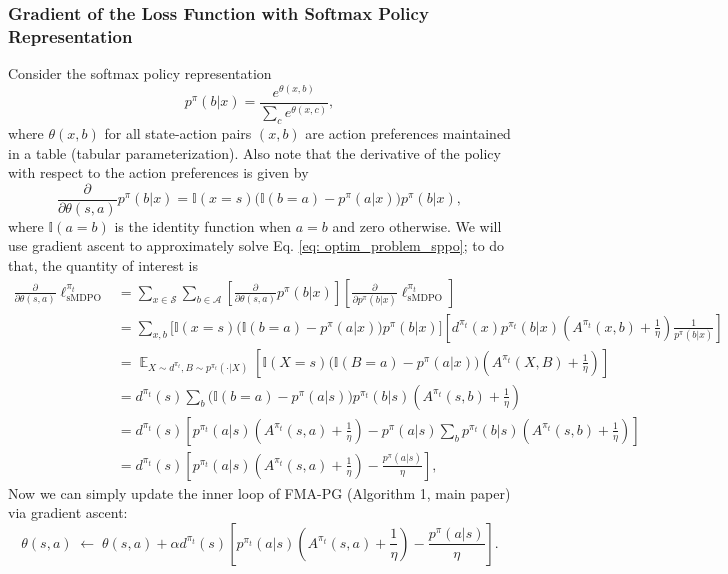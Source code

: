\documentclass[a4paper, 10pt]{article}
\DeclareMathOperator{\E}{\mathbb{E}}
\begin{document}
\subsubsection{Gradient of the Loss Function with Softmax Policy Representation}
Consider the softmax policy representation
\begin{equation}
  p^\pi(b | x) = \frac{e^{\theta(x, b)}}{\sum_c e^{\theta(x, c)}}, \label{eq: softmax}
\end{equation}
where $\theta(x, b)$ for all state-action pairs $(x, b)$ are action preferences maintained in a table (tabular parameterization). Also note that the derivative of the policy with respect to the action preferences is given by
\begin{equation}
  \frac{\partial}{\partial \theta(s, a)} p^\pi(b | x) = \mathbb{I}(x = s) \Big( \mathbb{I}(b = a) - p^\pi(a | x) \Big) p^\pi(b | x),
\end{equation}
where $\mathbb{I}(a = b)$ is the identity function when $a = b$ and zero otherwise. 
We will use gradient ascent to approximately solve Eq. \ref{eq: optim_problem_sppo}; to do that, the quantity of interest is
\begin{align}
  \frac{\partial}{\partial \theta(s, a)} \ell^{\pi_t}_{\text{sMDPO}} &= \sum_{x \in \mathcal{S}} \sum_{b \in \mathcal{A}} \left[ \frac{\partial}{\partial \theta(s, a)} p^\pi(b | x) \right] \left[ \frac{\partial}{\partial p^\pi(b | x)} \ell^{\pi_t}_{\text{sMDPO}} \right] \tag*{(using total derivative)} \\
  &= \sum_{x, b} \Big[ \mathbb{I}(x = s) \Big( \mathbb{I}(b = a) - p^\pi(a | x) \Big) p^\pi(b | x) \Big] \left[ d^{\pi_t}(x) p^{\pi_t}(b|x) \left( A^{\pi_t}(x, b) + \frac{1}{\eta} \right) \frac{1}{p^\pi(b|x)} \right] \nonumber \\
  &= \E_{X \sim d^{\pi_t}, B \sim p^{\pi_t}(\cdot | X)} \left[ \mathbb{I}(X = s) \Big( \mathbb{I}(B = a) - p^\pi(a | x) \Big) \left( A^{\pi_t}(X, B) + \frac{1}{\eta} \right) \right] \\
  &= d^{\pi_t}(s) \sum_b \Big( \mathbb{I}(b = a) - p^\pi(a | s) \Big) p^{\pi_t}(b|s) \left( A^{\pi_t}(s, b) + \frac{1}{\eta} \right) \nonumber \\
  &= d^{\pi_t}(s) \left[ p^{\pi_t}(a|s) \left( A^{\pi_t}(s, a) + \frac{1}{\eta} \right) - p^\pi(a | s) \sum_b p^{\pi_t}(b|s) \left(A^{\pi_t}(s, b) + \frac{1}{\eta} \right) \right] \nonumber \\
  &= d^{\pi_t}(s) \left[ p^{\pi_t}(a|s) \left( A^{\pi_t}(s, a) + \frac{1}{\eta} \right) - \frac{p^\pi(a | s)}{\eta} \right], \nonumber
\end{align}
Now we can simply update the inner loop of FMA-PG (Algorithm 1, main paper) via gradient ascent:
\begin{equation}
  \theta(s, a) \; \leftarrow \; \theta(s, a) + \alpha d^{\pi_t}(s) \left[ p^{\pi_t}(a|s) \left( A^{\pi_t}(s, a) + \frac{1}{\eta} \right) - \frac{p^\pi(a | s)}{\eta} \right].
\end{equation}
\end{document}
